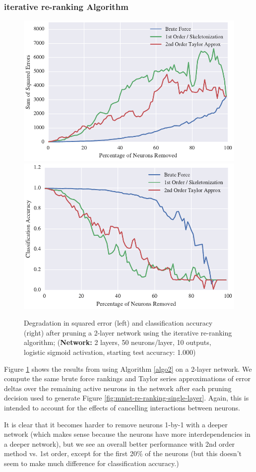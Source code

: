 \subsubsection{iterative re-ranking Algorithm}
\begin{figure}[!ht]
\centering
\includegraphics[width=0.49\linewidth]{mnist-deep-iterative-rerank-method.pdf}
\includegraphics[width=0.49\linewidth]{mnist-deep-iterative-rerank-accuracy.pdf}
\caption{Degradation in squared error (left) and classification accuracy (right) after pruning a 2-layer network using the iterative re-ranking algorithm; (\textbf{Network:} 2 layers, 50 neurons/layer, 10 outputs, logistic sigmoid activation, starting test accuracy: 1.000)}
\label{fig:mnist-re-ranking-double-layer}
\end{figure}

Figure \ref{fig:mnist-re-ranking-double-layer} shows the results from using Algorithm \ref{algo2} on a 2-layer network. We compute the same brute force rankings and Taylor series approximations of error deltas over the remaining active neurons in the network after each pruning decision used to generate Figure \ref{fig:mnist-re-ranking-single-layer}. Again, this is intended to account for the effects of cancelling interactions between neurons. 

It is clear that it becomes harder to remove neurons 1-by-1 with a deeper network (which makes sense because the neurons have more interdependencies in a deeper network), but we see an overall better performance with 2nd order method vs. 1st order, except for the first 20\% of the neurons (but this doesn't seem to make much difference for classification accuracy.) 

